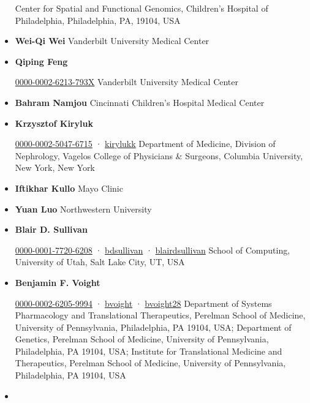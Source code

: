 \documentclass[
  legalpaperpaper,
]{article}
\begin{document}
\begin{itemize}
  Center for Spatial and Functional Genomics, Children's Hospital of Philadelphia, Philadelphia, PA, 19104, USA
\item
  \textbf{Wei-Qi Wei}
  Vanderbilt University Medical Center
\item
  \textbf{Qiping Feng}
  
  \href{https://orcid.org/0000-0002-6213-793X}{0000-0002-6213-793X}
  Vanderbilt University Medical Center
\item
  \textbf{Bahram Namjou}
  Cincinnati Children's Hospital Medical Center
\item
  \textbf{Krzysztof Kiryluk}
  
  \href{https://orcid.org/0000-0002-5047-6715}{0000-0002-5047-6715}
  · 
  \href{https://twitter.com/kirylukk}{kirylukk}
  Department of Medicine, Division of Nephrology, Vagelos College of Physicians \& Surgeons, Columbia University, New York, New York
\item
  \textbf{Iftikhar Kullo}
  Mayo Clinic
\item
  \textbf{Yuan Luo}
  Northwestern University
\item
  \textbf{Blair D. Sullivan}
  
  \href{https://orcid.org/0000-0001-7720-6208}{0000-0001-7720-6208}
  · 
  \href{https://github.com/bdsullivan}{bdsullivan}
  · 
  \href{https://twitter.com/blairdsullivan}{blairdsullivan}
  School of Computing, University of Utah, Salt Lake City, UT, USA
\item
  \textbf{Benjamin F. Voight}
  
  \href{https://orcid.org/0000-0002-6205-9994}{0000-0002-6205-9994}
  · 
  \href{https://github.com/bvoight}{bvoight}
  · 
  \href{https://twitter.com/bvoight28}{bvoight28}
  Department of Systems Pharmacology and Translational Therapeutics, Perelman School of Medicine, University of Pennsylvania, Philadelphia, PA 19104, USA; Department of Genetics, Perelman School of Medicine, University of Pennsylvania, Philadelphia, PA 19104, USA; Institute for Translational Medicine and Therapeutics, Perelman School of Medicine, University of Pennsylvania, Philadelphia, PA 19104, USA
\item

\end{itemize}
\end{document}

